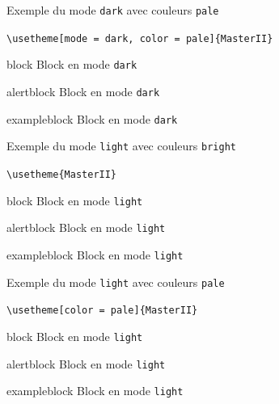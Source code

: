 \documentclass[french]{beamer}
\begin{document}
  {\darkmode\palecolors
  \begin{frame}[fragile]{Exemple du mode \verb;dark; avec couleurs \verb:pale:}
    \begin{center}
      \verb;\usetheme[mode = dark, color = pale]{MasterII};
    \end{center}
            
    \begin{block}{block}
      Block en mode \verb.dark.
    \end{block}
    \begin{alertblock}{alertblock}
      Block en mode \verb.dark.
    \end{alertblock}
    \begin{exampleblock}{exampleblock}
      Block en mode \verb.dark.
    \end{exampleblock}
  \end{frame}
  }
  
  {\lightmode\brightcolors
  \begin{frame}[fragile]{Exemple du mode \verb;light; avec couleurs \verb:bright:}
    \begin{center}
      \verb;\usetheme{MasterII};
    \end{center}
        
    \begin{block}{block}
      Block en mode \verb.light.
    \end{block}
    \begin{alertblock}{alertblock}
      Block en mode \verb.light.
    \end{alertblock}
    \begin{exampleblock}{exampleblock}
      Block en mode \verb.light.
    \end{exampleblock}
  \end{frame}
  }
  
  {\lightmode\palecolors
  \begin{frame}[fragile]{Exemple du mode \verb;light; avec couleurs \verb:pale:}
    \begin{center}
      \verb;\usetheme[color = pale]{MasterII};
    \end{center}
        
    \begin{block}{block}
      Block en mode \verb.light.
    \end{block}
    \begin{alertblock}{alertblock}
      Block en mode \verb.light.
    \end{alertblock}
    \begin{exampleblock}{exampleblock}
      Block en mode \verb.light.
    \end{exampleblock}
  \end{frame}
  }
  
\end{document}
